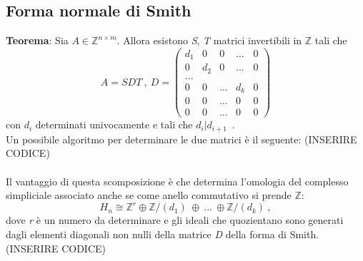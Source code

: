 \documentclass{article}
\begin{document}
\subsection{Forma normale di Smith}
\textbf{Teorema}: Sia \(A\in\mathbb{Z}^{n\times m}\). Allora esistono \textit{S}, \textit{T} matrici invertibili in \(\mathbb{Z}\) tali che
\[A=SDT\ , \ D=\begin{pmatrix}d_1 & 0 & 0 & ... & 0\\
0 & d_2 & 0 & ... & 0\\
... \\
0 & 0 & ... & d_k & 0\\
0 & 0 & ... & 0 & 0\\
0 & 0 & ... & 0 & 0
\end{pmatrix}\]
con \(d_i\) determinati univocamente e tali che \(d_i|d_{i+1}\)\ .\\ 
Un possibile algoritmo per determinare le due matrici è il seguente: (INSERIRE CODICE)\\ \\
Il vantaggio di questa scomposizione è che determina l'omologia del complesso simpliciale associato anche se come anello commutativo si prende \(\mathbb{Z}\): \[H_n\cong \mathbb{Z}^r \oplus\mathbb{Z}/(d_1)\ \oplus\ ...\ \oplus \mathbb{Z}/(d_k)\ ,\]
dove \textit{r} è un numero da determinare e gli ideali che quozientano sono generati dagli elementi diagonali non nulli della matrice \textit{D} della forma di Smith. (INSERIRE CODICE)
\end{document}
